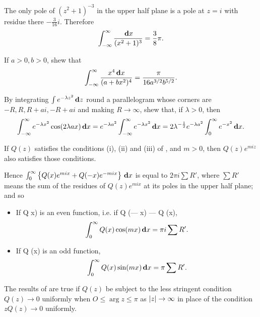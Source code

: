 \begin{wandwexample}
  The only pole of $(z^{2} + 1)^{-3}$ in the upper half plane is a
  pole at $z=i$ with residue there $-\frac{3}{16} i$. Therefore
  $$
  \int_{-\infty}^{\infty} \frac{\, \mathbf{d} x}{ (x^{2}+1)^{3} }
  =
  \frac{3}{8} \pi.
  $$
\end{wandwexample}
\begin{wandwexample}
If $a > 0, b > 0$, shew that
$$
\int_{-\infty}^{\infty}
\frac{x^{4} \, \mathbf{d} x}{ (a + bx^{2})^{4} }
=
\frac{\pi}{ 16 a^{3/2} b^{5/2}}.
$$
\end{wandwexample}
\begin{wandwexample}
  By integrating $\int e^{-\lambda z^{2}} \, \mathbf{d} z$ round a
parallelogram whose corners are $-R, R, R + ai, -R + ai$ and making $R
\rightarrow \infty$, shew that, if $\lambda > 0$, then
  $$
  \int_{-\infty}^{\infty} e^{-\lambda x^{2}} \cos (2\lambda a x)
\, \mathbf{d} x = e^{-\lambda a^{2}} \int_{-\infty}^{\infty} e^{-\lambda
x^{2}} \, \mathbf{d} x = 2 \lambda^{-\frac{1}{2}} e^{-\lambda a^{2}}
\int_{0}^{\infty} e^{-x^{2}} \, \mathbf{d} x.
  $$
\end{wandwexample}
If $Q(z)$ satisfies the conditions (i), (ii) and (iii) of
, and $m > 0$,
then $Q(z) e^{miz}$ also satisfies those conditions.

%
%

Hence
$
\int_{0}^{\infty}
\left\{ 
  Q(x) e^{mix} + Q(-x) e^{-mix}
 \right\}
\, \mathbf{d} x
$
is equal to $2\pi i \sum R'$, where
$\sum R'$ means the sum of the residues of $Q(z) e^{mix}$ at its poles
in the upper half plane; and so
\begin{itemize}
\item %
  If Q x) is an even function, i.e. if Q (— x) — Q (x),
  $$
  \int_{0}^{\infty} Q(x) \cos(mx) \, \mathbf{d} x
  =
  \pi i \sum R'.
  $$
\item %
  If Q (x) is an odd function,
  $$
  \int_{0}^{\infty} Q(x) \sin(mx) \, \mathbf{d} x
  =
  \pi \sum R'.
  $$
\end{itemize}

The results of  are true if $Q(z)$ be
subject to the less stringent condition $Q(z) \rightarrow 0$ uniformly
when
$O \leq \arg z \leq \pi$ as $\left| z \right| \rightarrow \infty$ in
place of the condition $z Q(z) \rightarrow 0$ uniformly.

